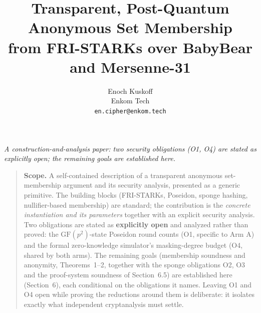 \documentclass[11pt]{article}
\title{Transparent, Post-Quantum Anonymous Set Membership\\
from FRI-STARKs over BabyBear and Mersenne-31}
\author{Enoch Kuskoff\\ Enkom Tech\\ \texttt{en.cipher@enkom.tech}}
\date{}
\newcommand{\GF}[1]{\mathrm{GF}(#1)}
\theoremstyle{plain}
\theoremstyle{definition}
\begin{document}
\maketitle

\begin{center}\itshape
A construction-and-analysis paper: two security obligations (O1, O4) are stated as explicitly open;
the remaining goals are established here.
\end{center}

\begin{quote}
\textbf{Scope.} A self-contained description of a transparent anonymous set-membership argument and
its security analysis, presented as a generic primitive. The building blocks (FRI-STARKs, Poseidon,
sponge hashing, nullifier-based membership) are standard; the contribution is the \emph{concrete
instantiation and its parameters} together with an explicit security analysis. Two obligations are
stated as \textbf{explicitly open} and analyzed rather than proved: the $\GF{p^2}$-state Poseidon
round counts (O1, specific to Arm A) and the formal zero-knowledge simulator's masking-degree budget
(O4, shared by both arms). The remaining goals (membership soundness and anonymity, Theorems~1--2,
together with the sponge obligations O2, O3 and the proof-system soundness of Section~6.5) are
established here (Section~6), each conditional on the obligations it names. Leaving O1 and O4 open
while proving the reductions around them is deliberate: it isolates exactly what independent
cryptanalysis must settle.
\end{quote}
\end{document}
